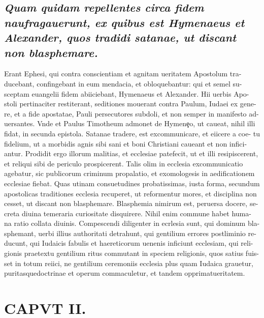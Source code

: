 \documentclass{article}
\begin{document}
\begin{pages}
\subsection*{\textit{Quam quidam repellentes circa fidem naufragauerunt, ex quibus est Hymenaeus et Alexander, quos tradidi satanae, ut discant non blasphemare. }}\pstart Erant Ephesi, qui contra conscientiam et agnitam ueritatem Apostolum tra- ducebant, confingebant in eum mendacia, et obloquebantur: qui et semel su- sceptam euangelii fidem abiiciebant, Hymenaeus et Alexander. Hii uerbis Apo- stoli pertinaciter restiterant, seditiones mouerant contra Paulum, Iudaei ex gene- re, et a fide apostatae, Pauli persecutores subdoli, et non semper in manifesto ad- uersantes. Vnde et Paulus Timotheum admonet de Hymenȩo, ut caueat, nihil illi fidat, in secunda epistola. Satanae tradere, est excommunicare, et eiicere a coe- tu fidelium, ut a morbidis agnis sibi sani et boni Christiani caueant et non infici- antur. Prodidit ergo illorum malitias, et ecclesiae patefecit, ut et illi resipiscerent, et reliqui sibi de periculo prospicerent. Talis olim in ecclesia excommunicatio agebatur, sic publicorum criminum propalatio, et exomologesis in aedificationem ecclesiae fiebat. Quas utinam consuetudines probatissimas, iusta forma, secundum apostolicas traditiones ecclesia recuperet, ut reformentur mores, et disciplina non cesset, ut discant non blasphemare. Blasphemia nimirum est, peruersa docere, se- creta diuina temeraria curiositate disquirere. Nihil enim commune habet huma- na ratio collata diuinis. Compescendi diligenter in ecrlesia sunt, qui dominum bla- sphemant, uerbi illius authoritati detrahunt, qui gentilium errores postliminio re- ducunt, qui Iudaicis fabulis et haereticorum uenenis inficiunt ecclesiam, qui reli- gionis praetextu gentilium ritus commutant in speciem religionis, quos satius fuis- set in totum reiici, ne gentilium ceremoniis ecclesia plus quam Iudaica grauetur, puritasquedoctrinae et operum commaculetur, et tandem opprimatueritatem.  \pend
\endnumbering\beginnumbering\section{CAPVT II.}
{}

\end{pages}
\end{document}
